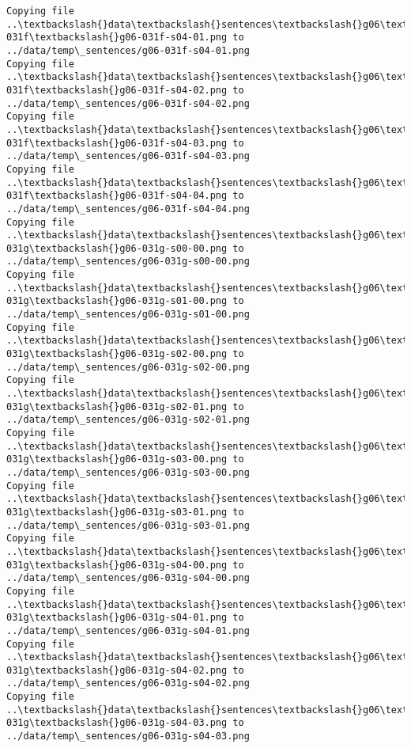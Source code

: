 \documentclass[11pt]{article}
\begin{document}
\begin{Verbatim}[commandchars=\\\{\}]
Copying file ..\textbackslash{}data\textbackslash{}sentences\textbackslash{}g06\textbackslash{}g06-031f\textbackslash{}g06-031f-s04-01.png to
../data/temp\_sentences/g06-031f-s04-01.png
Copying file ..\textbackslash{}data\textbackslash{}sentences\textbackslash{}g06\textbackslash{}g06-031f\textbackslash{}g06-031f-s04-02.png to
../data/temp\_sentences/g06-031f-s04-02.png
Copying file ..\textbackslash{}data\textbackslash{}sentences\textbackslash{}g06\textbackslash{}g06-031f\textbackslash{}g06-031f-s04-03.png to
../data/temp\_sentences/g06-031f-s04-03.png
Copying file ..\textbackslash{}data\textbackslash{}sentences\textbackslash{}g06\textbackslash{}g06-031f\textbackslash{}g06-031f-s04-04.png to
../data/temp\_sentences/g06-031f-s04-04.png
Copying file ..\textbackslash{}data\textbackslash{}sentences\textbackslash{}g06\textbackslash{}g06-031g\textbackslash{}g06-031g-s00-00.png to
../data/temp\_sentences/g06-031g-s00-00.png
Copying file ..\textbackslash{}data\textbackslash{}sentences\textbackslash{}g06\textbackslash{}g06-031g\textbackslash{}g06-031g-s01-00.png to
../data/temp\_sentences/g06-031g-s01-00.png
Copying file ..\textbackslash{}data\textbackslash{}sentences\textbackslash{}g06\textbackslash{}g06-031g\textbackslash{}g06-031g-s02-00.png to
../data/temp\_sentences/g06-031g-s02-00.png
Copying file ..\textbackslash{}data\textbackslash{}sentences\textbackslash{}g06\textbackslash{}g06-031g\textbackslash{}g06-031g-s02-01.png to
../data/temp\_sentences/g06-031g-s02-01.png
Copying file ..\textbackslash{}data\textbackslash{}sentences\textbackslash{}g06\textbackslash{}g06-031g\textbackslash{}g06-031g-s03-00.png to
../data/temp\_sentences/g06-031g-s03-00.png
Copying file ..\textbackslash{}data\textbackslash{}sentences\textbackslash{}g06\textbackslash{}g06-031g\textbackslash{}g06-031g-s03-01.png to
../data/temp\_sentences/g06-031g-s03-01.png
Copying file ..\textbackslash{}data\textbackslash{}sentences\textbackslash{}g06\textbackslash{}g06-031g\textbackslash{}g06-031g-s04-00.png to
../data/temp\_sentences/g06-031g-s04-00.png
Copying file ..\textbackslash{}data\textbackslash{}sentences\textbackslash{}g06\textbackslash{}g06-031g\textbackslash{}g06-031g-s04-01.png to
../data/temp\_sentences/g06-031g-s04-01.png
Copying file ..\textbackslash{}data\textbackslash{}sentences\textbackslash{}g06\textbackslash{}g06-031g\textbackslash{}g06-031g-s04-02.png to
../data/temp\_sentences/g06-031g-s04-02.png
Copying file ..\textbackslash{}data\textbackslash{}sentences\textbackslash{}g06\textbackslash{}g06-031g\textbackslash{}g06-031g-s04-03.png to
../data/temp\_sentences/g06-031g-s04-03.png

\end{Verbatim}
\end{document}
